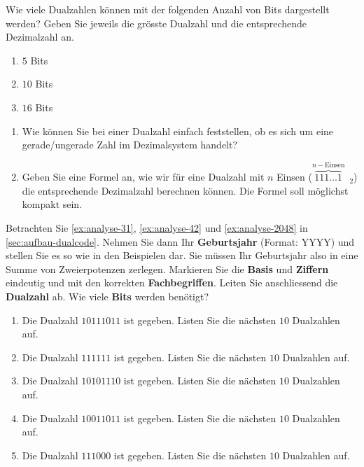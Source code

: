 \begin{exercise}
Wie viele Dualzahlen können mit der folgenden Anzahl von Bits dargestellt werden? Geben Sie jeweils die grösste Dualzahl und die entsprechende Dezimalzahl an.

\begin{enumerate}
\item $5$ Bits
\fillwithlines{0.25in}
\item $10$ Bits
\fillwithlines{0.25in}
\item $16$ Bits
\fillwithlines{0.25in}
\end{enumerate}
\end{exercise}

\vspace{-0.35cm}

\begin{exercise}
\begin{enumerate}
\item Wie können Sie bei einer Dualzahl einfach feststellen, ob es sich um eine gerade/ungerade Zahl im Dezimalsystem handelt?
\fillwithgrid{0.5in}
\item Geben Sie eine Formel an, wie wir für eine Dualzahl mit $n$ Einsen ($\overbrace{111\dots1}^{n-\textrm{Einsen}}$~$_2$) die entsprechende Dezimalzahl berechnen können. Die Formel soll möglichst kompakt sein.
\fillwithgrid{0.5in}
\end{enumerate}
\end{exercise}

\vspace{-0.35cm}

\begin{exercise}
Betrachten Sie \autoref{ex:analyse-31}, \autoref{ex:analyse-42} und \autoref{ex:analyse-2048} in \autoref{sec:aufbau-dualcode}. Nehmen Sie dann Ihr \textbf{Geburtsjahr} (Format: YYYY) und stellen Sie es so wie in den Beispielen dar. Sie müssen Ihr Geburtsjahr also in eine Summe von Zweierpotenzen zerlegen. Markieren Sie die \textbf{Basis} und \textbf{Ziffern} eindeutig und mit den korrekten \textbf{Fachbegriffen}. Leiten Sie anschliessend die \textbf{Dualzahl} ab. Wie viele \textbf{Bits} werden benötigt?
\end{exercise}

\begin{exercise}
\begin{enumerate}
\item Die Dualzahl $10111011$ ist gegeben. Listen Sie die nächsten $10$ Dualzahlen auf.
\fillwithgrid{1in}
\item Die Dualzahl $111111$ ist gegeben. Listen Sie die nächsten $10$ Dualzahlen auf.
\fillwithgrid{1in}
\item Die Dualzahl $10101110$ ist gegeben. Listen Sie die nächsten $10$ Dualzahlen auf.
\fillwithgrid{1in}
\item Die Dualzahl $10011011$ ist gegeben. Listen Sie die nächsten $10$ Dualzahlen auf.
\fillwithgrid{1in}
\item Die Dualzahl $111000$ ist gegeben. Listen Sie die nächsten $10$ Dualzahlen auf.
\fillwithgrid{1in}
\end{enumerate}
\end{exercise}